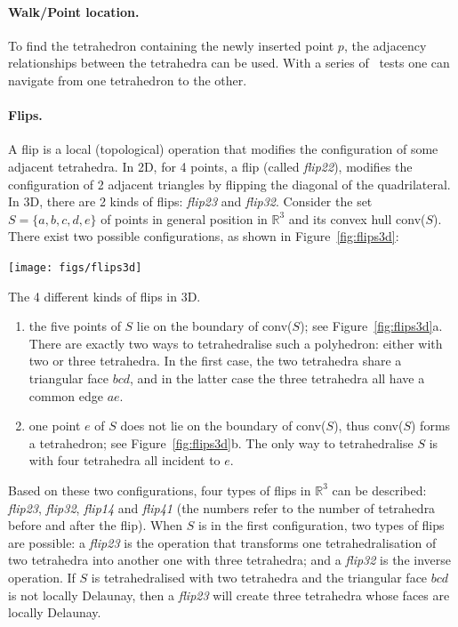 \paragraph{Walk/Point location.}
To find the tetrahedron containing the newly inserted point $p$, the adjacency relationships between the tetrahedra can be used. 
With a series of \Orient\ tests one can navigate from one tetrahedron to the other.

\paragraph{Flips.}
A flip is a local (topological) operation that modifies the configuration of some adjacent tetrahedra. 
In 2D, for 4 points, a flip (called \emph{flip22}), modifies the configuration of 2 adjacent triangles by flipping the diagonal of the quadrilateral.
In 3D, there are 2 kinds of flips: \emph{flip23} and \emph{flip32}.
Consider the set $S = \{a, b, c, d, e\}$ of points in general position in $\mathbb{R}^{3}$ and its convex hull conv($S$). 
There exist two possible configurations, as shown in Figure~\ref{fig:flips3d}:
\begin{marginfigure}
  \centering
  \texttt{[image: figs/flips3d]}
  \caption{The 4 different kinds of flips in 3D.}%
\label{fig:flips3d}
\end{marginfigure}
\begin{enumerate}
  \item the five points of $S$ lie on the boundary of conv($S$); see Figure~\ref{fig:flips3d}a. There are exactly two ways to tetrahedralise such a polyhedron: either with two or three tetrahedra. In the first case, the two tetrahedra share a triangular face $bcd$, and in the latter case the three tetrahedra all have a common edge $ae$.
  \item one point $e$ of $S$ does not lie on the boundary of conv($S$), thus conv($S$) forms a tetrahedron; see Figure~\ref{fig:flips3d}b. The only way to tetrahedralise $S$ is with four tetrahedra all incident to $e$.
\end{enumerate}
Based on these two configurations, four types of flips in $\mathbb{R}^{3}$ can be described: \emph{flip23}, \emph{flip32}, \emph{flip14} and \emph{flip41} (the numbers refer to the number of tetrahedra before and after the flip). 
When $S$ is in the first configuration, two types of flips are possible: a \emph{flip23} is the operation that transforms one tetrahedralisation of two tetrahedra into another one with three tetrahedra; and a \emph{flip32} is the inverse operation. 
If $S$ is tetrahedralised with two tetrahedra and the triangular face $bcd$ is not locally Delaunay, then a \emph{flip23} will create three tetrahedra whose faces are locally Delaunay. 

